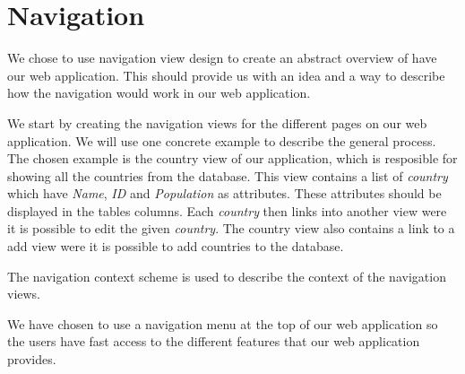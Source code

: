 \section{Navigation}
We chose to use navigation view design to create an abstract overview of have our web application. This should provide us with an idea and a way to describe how the navigation would work in our web application.

We start by creating the navigation views for the different pages on our web application. We will use one concrete example to describe the general process. The chosen example is the country view of our application, which is resposible for showing all the countries from the database. This view contains a list of \textit{country} which have \textit{Name}, \textit{ID} and \textit{Population} as attributes. These attributes should be displayed in the tables columns. Each \textit{country} then links into another view were it is possible to edit the given \textit{country}. The country view also contains a link to a add view were it is possible to add countries to the database.

The navigation context scheme is used to describe the context of the navigation views.

We have chosen to use a navigation menu at the top of our web application so the users have fast access to the different features that our web application provides. 